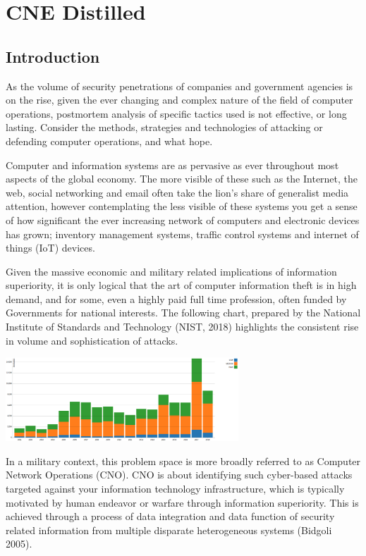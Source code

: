 \documentclass[11pt]{report}
\begin{document}
\chapter{CNE Distilled}


\section{Introduction}
As the volume of security penetrations of companies and government agencies is on the rise, given the ever changing and complex nature of the field of computer operations, postmortem analysis of specific tactics used is not effective, or long lasting.  Consider the methods, strategies and technologies of attacking or defending computer operations, and what hope.

Computer and information systems are as pervasive as ever throughout most aspects of the global economy. The more visible of these such as the Internet, the web, social networking and email often take the lion’s share of generalist media attention, however contemplating the less visible of these systems you get a sense of how significant the ever increasing network of computers and electronic devices has grown; inventory management systems, traffic control systems and internet of things (IoT) devices.

Given the massive economic and  military related implications of information superiority, it is only logical that the art of computer information theft is in high demand, and for some, even a highly paid full time profession, often funded by Governments for national interests. The following chart, prepared by the National Institute of Standards and Technology (NIST, 2018) \cite{nist} highlights the consistent rise in volume and sophistication of attacks.

\includegraphics[width=330px]{nist.png}

\begingroup %
\endgroup

In a military context, this problem space is more broadly referred to as Computer Network Operations (CNO). CNO is about identifying such cyber-based attacks targeted against your information technology infrastructure, which is typically motivated by human endeavor or warfare through information superiority. This is achieved through a process of data integration and data function of security related information from multiple disparate heterogeneous systems (Bidgoli 2005).
\end{document}

